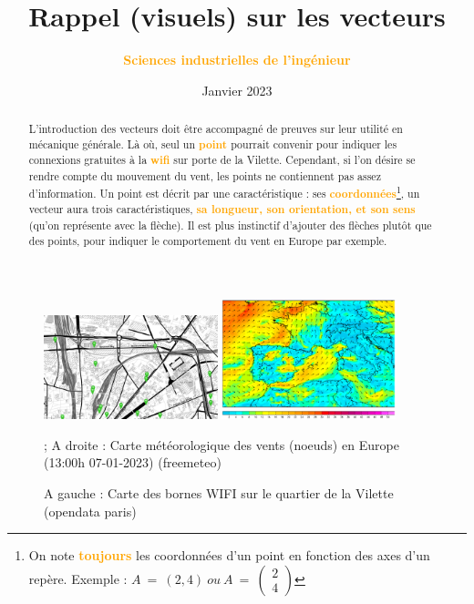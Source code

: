 \documentclass[12pt]{article}
\title{Rappel (visuels) sur les vecteurs}
\author{ \textcolor{orange}{\textbf{Sciences industrielles de l'ingénieur}}}
\date{Janvier 2023}
\begin{document}
\markboth{\theauthor}{\thetitle}

\maketitle


\begin{abstract}
L'introduction des vecteurs doit être accompagné de preuves sur leur utilité en mécanique générale. Là où, seul un \textcolor{orange}{\textbf{point}} pourrait convenir pour indiquer les connexions gratuites à la \textcolor{orange}{\textbf{wifi}} sur porte de la Vilette. Cependant, si l'on désire se rendre compte du mouvement du vent, les points ne contiennent pas assez d'information. Un point est décrit par une caractéristique : ses \textcolor{orange}{\textbf{coordonnées}}\footnote{On note \textcolor{orange}{\textbf{toujours}} les coordonnées d'un point en fonction des axes d'un repère. Exemple : $A\ =\ ( 2,4) \ ou\ A\ =\ \begin{pmatrix} 2\\4\end{pmatrix}$}, un vecteur aura trois caractéristiques, \textcolor{orange}{\textbf{sa longueur, son orientation, et son sens}} (qu'on représente avec la flèche). Il est plus instinctif d'ajouter des flèches plutôt que des points, pour indiquer le comportement du vent en Europe par exemple.
\end{abstract}

\begin{figure}[h]
    \centering
\begin{center}
     \includegraphics[width=0.45\textwidth]{Paris1.png} \includegraphics[width=0.45\textwidth]{Paris2.png}
     \caption{A gauche : Carte des bornes WIFI sur le quartier de la Vilette (opendata paris)}; A droite : Carte météorologique des vents (noeuds) en Europe (13:00h 07-01-2023) (freemeteo)
\end{center}
\end{figure}
\end{document}
